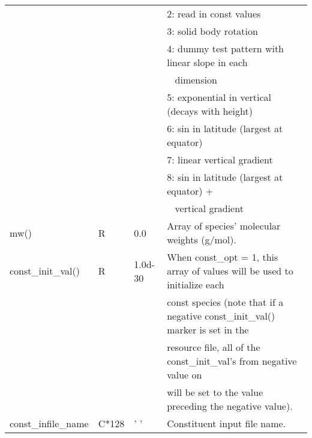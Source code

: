 {\begin{landscape}
\begin{center}
\begin{longtable}{|l|l|l|l|}
                    &   &         & 2:  read in const values  \\
                    &   &         & 3:  solid body rotation  \\
                    &   &         & 4:  dummy test pattern with linear slope in each   \\
                    &   &         & \mbox{  } dimension  \\
                    &   &         & 5:  exponential in vertical (decays with height)  \\
                    &   &         & 6:  sin in latitude (largest at equator)  \\
                    &   &         & 7:  linear vertical gradient  \\
                    &   &         & 8:  sin in latitude (largest at equator) +  \\
                    &   &         & \mbox{  } vertical gradient  \\ \hline
mw()                & R &  0.0   & Array of species' molecular weights (g/mol).  \\ \hline
const\_init\_val()  & R & 1.0d-30 & When const\_opt = 1, this array of values will be used to initialize each  \\
                    &   &         & const species (note that if a negative const\_init\_val() marker is set in the  \\
                    &   &         & resource file, all of the const\_init\_val's  from negative value on  \\ 
                    &   &         & will be set to the value preceding the negative value).  \\ \hline
const\_infile\_name &C*128& ' '    &Constituent input file name.  \\ \hline


\end{longtable}
\end{center}
\end{landscape}}
